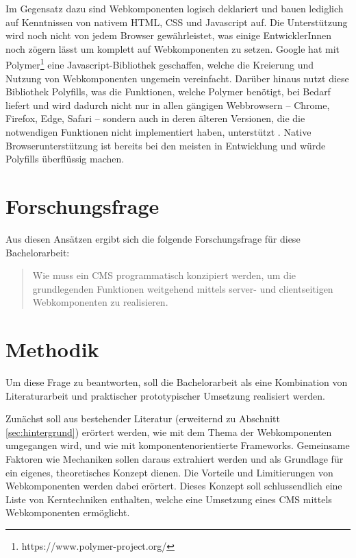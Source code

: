 Im Gegensatz dazu sind Webkomponenten logisch deklariert und bauen lediglich auf Kenntnissen von nativem HTML, CSS und Javascript auf. Die Unterstützung wird noch nicht von jedem Browser gewährleistet, was einige EntwicklerInnen noch zögern lässt um komplett auf Webkomponenten zu setzen.
Google hat mit Polymer\footnote{https://www.polymer-project.org/} eine Javascript-Bibliothek geschaffen, welche die Kreierung und Nutzung von Webkomponenten ungemein vereinfacht. Darüber hinaus nutzt diese Bibliothek Polyfills, was die Funktionen, welche Polymer benötigt, bei Bedarf liefert und wird dadurch nicht nur in allen gängigen Webbrowsern -- Chrome, Firefox, Edge, Safari --  sondern auch in deren älteren Versionen, die die notwendigen Funktionen nicht implementiert haben, unterstützt \cite{polymer-compatibility}. Native Browserunterstützung ist bereits bei den meisten in Entwicklung und würde Polyfills überflüssig machen.  
  
\section{Forschungsfrage}

Aus diesen Ansätzen ergibt sich die folgende Forschungsfrage für diese Bachelorarbeit:

\begin{quote}
Wie muss ein CMS programmatisch konzipiert werden, um die grundlegenden Funktionen weitgehend mittels server- und clientseitigen Webkomponenten zu realisieren.
\end{quote}

\section{Methodik}

Um diese Frage zu beantworten, soll die Bachelorarbeit als eine Kombination von Literaturarbeit und praktischer \bzw prototypischer Umsetzung realisiert werden.

Zunächst soll aus bestehender Literatur (erweiternd zu Abschnitt \ref{sec:hintergrund}) erörtert werden, wie mit dem Thema der Webkomponenten umgegangen wird, und wie mit komponentenorientierte Frameworks. Gemeinsame Faktoren wie Mechaniken sollen daraus extrahiert werden und als Grundlage für ein eigenes, theoretisches Konzept dienen. Die Vorteile und Limitierungen von Webkomponenten werden dabei erörtert. Dieses Konzept soll schlussendlich eine Liste von Kerntechniken enthalten, welche eine Umsetzung eines CMS mittels Webkomponenten ermöglicht.


